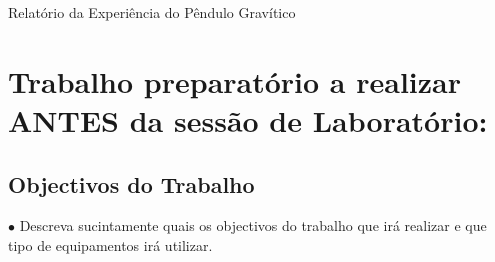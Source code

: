 \documentclass[a4paper,12pt]{article}      %
\author{Prof. Bernardo B. Carvalho}
\date{ Setembro 2019}
\begin{document}
 
{  \sf  Relatório da Experiência do Pêndulo Gravítico} %



%


\section{\sf Trabalho preparatório a realizar ANTES da sessão de Laboratório:}


\subsection{\sf Objectivos do Trabalho}
 \begin{flushleft}
	 $\bullet$  Descreva sucintamente quais os objectivos do trabalho que irá realizar e que tipo de equipamentos irá utilizar.
 \end{flushleft}
\noindent\underline{\makebox[\textwidth][r]{~}} \\
\noindent\underline{\makebox[\textwidth][r]{~}} \\
\noindent\underline{\makebox[\textwidth][r]{~}} \\
\noindent\underline{\makebox[\textwidth][r]{~}} \\
\noindent\underline{\makebox[\textwidth][r]{~}} \\

%
%
%
\end{document}
